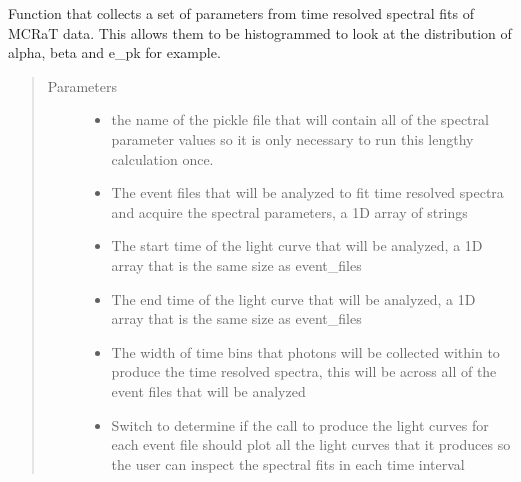 \documentclass[letterpaper,10pt,english]{sphinxmanual}
\begin{document}

\begin{fulllineitems}
\label{\detokenize{read_process_files:read_process_files.band_hist_data}}
Function that collects a set of parameters from time resolved spectral fits of MCRaT data. This allows them to be
histogrammed to look at the distribution of alpha, beta and e\_pk for example.
\begin{quote}\begin{description}
\item[{Parameters}] \leavevmode\begin{itemize}
\item {} 
 \textendash{} the name of the pickle file that will contain all of the spectral parameter values so it is only
necessary to run this lengthy calculation once.

\item {} 
 \textendash{} The event files that will be analyzed to fit time resolved spectra and acquire the spectral
parameters, a 1D array of strings

\item {} 
 \textendash{} The start time of the light curve that will be analyzed, a 1D array that is the same size as
event\_files

\item {} 
 \textendash{} The end time of the light curve that will be analyzed, a 1D array that is the same size as
event\_files

\item {} 
 \textendash{} The width of time bins that photons will be collected within to produce the time resolved spectra, this
will be across all of the event files that will be analyzed

\item {} 
 \textendash{} Switch to determine if the call to produce the light curves for each event file should plot
all the light curves that it produces so the user can inspect the spectral fits in each time interval


\end{itemize}
\end{description}
\end{quote}
\end{fulllineitems}
\end{document}
